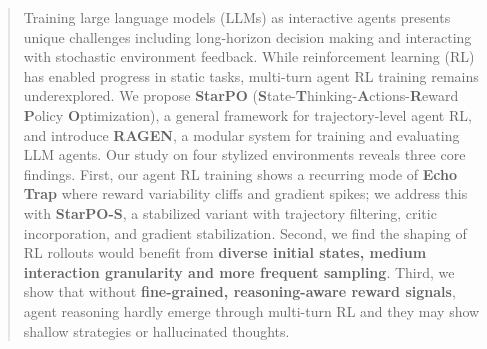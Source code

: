 \begin{abstract}

Training large language models (LLMs) as interactive agents presents unique challenges including long-horizon decision making and interacting with stochastic environment feedback. While reinforcement learning (RL) has enabled progress in static tasks, multi-turn agent RL training remains underexplored. We propose \textbf{StarPO} (\textbf{S}tate-\textbf{T}hinking-\textbf{A}ctions-\textbf{R}eward \textbf{P}olicy \textbf{O}ptimization), a general framework for trajectory-level agent RL, and introduce \textbf{RAGEN}, a modular system for training and evaluating LLM agents. 
Our study on four stylized environments reveals three core findings. First, our agent RL training shows a recurring mode of \textbf{Echo Trap} where reward variability cliffs and gradient spikes; we address this with \textbf{StarPO-S}, a stabilized variant with trajectory filtering, critic incorporation, and gradient stabilization.
Second, we find the shaping of RL rollouts would benefit from \textbf{diverse initial states, medium interaction granularity and more frequent sampling}. 
Third, we show that without \textbf{fine-grained, reasoning-aware reward signals}, agent reasoning hardly emerge through multi-turn RL and they may show shallow strategies or hallucinated thoughts. 



\end{abstract}
